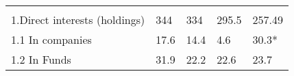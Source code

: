 \documentclass[]{book}
\theoremstyle{definition}
\theoremstyle{definition}
\theoremstyle{definition}
\theoremstyle{remark}
\begin{document}
\begin{longtable}[]{@{}lllll@{}}
\begin{minipage}[t]{0.17\columnwidth}
\strut
\end{minipage}\tabularnewline
\begin{minipage}[t]{0.17\columnwidth}\raggedright\strut
1.Direct interests (holdings)\strut
\end{minipage} & \begin{minipage}[t]{0.17\columnwidth}\raggedright\strut
344\strut
\end{minipage} & \begin{minipage}[t]{0.17\columnwidth}\raggedright\strut
334\strut
\end{minipage} & \begin{minipage}[t]{0.17\columnwidth}\raggedright\strut
295.5\strut
\end{minipage} & \begin{minipage}[t]{0.17\columnwidth}\raggedright\strut
257.49\strut
\end{minipage}\tabularnewline
\begin{minipage}[t]{0.17\columnwidth}\raggedright\strut
1.1 In companies\strut
\end{minipage} & \begin{minipage}[t]{0.17\columnwidth}\raggedright\strut
17.6\strut
\end{minipage} & \begin{minipage}[t]{0.17\columnwidth}\raggedright\strut
14.4\strut
\end{minipage} & \begin{minipage}[t]{0.17\columnwidth}\raggedright\strut
4.6\strut
\end{minipage} & \begin{minipage}[t]{0.17\columnwidth}\raggedright\strut
30.3*\strut
\end{minipage}\tabularnewline
\begin{minipage}[t]{0.17\columnwidth}\raggedright\strut
1.2 In Funds\strut
\end{minipage} & \begin{minipage}[t]{0.17\columnwidth}\raggedright\strut
31.9\strut
\end{minipage} & \begin{minipage}[t]{0.17\columnwidth}\raggedright\strut
22.2\strut
\end{minipage} & \begin{minipage}[t]{0.17\columnwidth}\raggedright\strut
22.6\strut
\end{minipage} & \begin{minipage}[t]{0.17\columnwidth}\raggedright\strut
23.7\strut
\end{minipage}\tabularnewline

\end{longtable}
\end{document}
